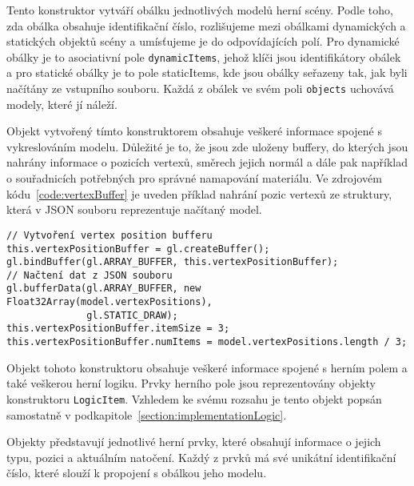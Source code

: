 \label{paragraph:obálky}
Tento konstruktor vytváří obálku jednotlivých modelů herní scény. Podle toho, zda obálka obsahuje identifikační číslo, rozlišujeme mezi obálkami dynamických a statických objektů scény a umísťujeme je do odpovídajících polí. Pro dynamické obálky je to asociativní pole \texttt{dynamicItems}, jehož klíči jsou identifikátory obálek a pro statické obálky je to pole staticItems, kde jsou obálky seřazeny tak, jak byli načítány ze vstupního souboru. Každá z obálek ve svém poli \texttt{objects} uchovává modely, které jí náleží. 

Objekt vytvořený tímto konstruktorem obsahuje veškeré informace spojené s vykreslováním modelu. Důležité je to, že jsou zde uloženy buffery, do kterých jsou nahrány informace o pozicích vertexů, směrech jejich normál a dále pak například o souřadnicích potřebných pro správné namapování materiálu. Ve zdrojovém kódu~\ref{code:vertexBuffer} je uveden příklad nahrání pozic vertexů ze struktury, která v JSON souboru reprezentuje načítaný model.

\begin{lstlisting}[caption=Příklad nahrání pozic vertexů do bufferu,label=code:vertexBuffer]
// Vytvoření vertex position bufferu
this.vertexPositionBuffer = gl.createBuffer();
gl.bindBuffer(gl.ARRAY_BUFFER, this.vertexPositionBuffer);
// Načtení dat z JSON souboru
gl.bufferData(gl.ARRAY_BUFFER, new Float32Array(model.vertexPositions), 
              gl.STATIC_DRAW);
this.vertexPositionBuffer.itemSize = 3;
this.vertexPositionBuffer.numItems = model.vertexPositions.length / 3;
\end{lstlisting}

\label{paragraph:logic}
Objekt tohoto konstruktoru obsahuje veškeré informace spojené s herním polem a také veškerou herní logiku. Prvky herního pole jsou reprezentovány objekty konstruktoru \texttt{LogicItem}. Vzhledem ke svému rozsahu je tento objekt popsán samostatně v podkapitole~\ref{section:implementationLogic}.

Objekty představují jednotlivé herní prvky, které obsahují informace o jejich typu, pozici a aktuálním natočení. Každý z prvků má své unikátní identifikační číslo, které slouží k propojení s obálkou jeho modelu.

